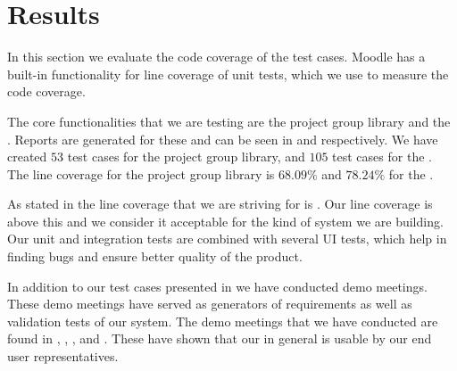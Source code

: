\section{Results}
\label{sec:results}
In this section we evaluate the code coverage of the test cases. 
Moodle has a built-in functionality for line coverage of unit tests, which we use to measure the code coverage.

The core functionalities that we are testing are the project group library and the \admlib{}.
Reports are generated for these and can be seen in  and  respectively.
We have created $53$ test cases for the project group library, and $105$ test cases for the \admlib{}.
The line coverage for the project group library is $68.09\%$ and $78.24\%$ for the \admlib{}.

As stated in  the line coverage that we are striving for is \idealCC{}.
Our line coverage is above this and we consider it acceptable for the kind of system we are building. 
Our unit and integration tests are combined with several UI tests, which help in finding bugs and ensure better quality of the product.

In addition to our test cases presented in  we have conducted demo meetings.
These demo meetings have served as generators of requirements as well as validation tests of our system.
The demo meetings that we have conducted are found in , , ,  and .
These have shown that our \subsystem{} in general is usable by our end user representatives.